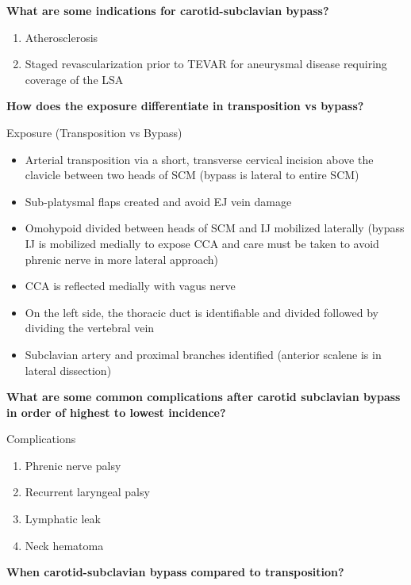 \documentclass[
]{book}
\begin{document}
\textbf{What are some indications for carotid-subclavian bypass?}

\begin{enumerate}
\def\labelenumi{\arabic{enumi}.}
\item
  Atherosclerosis~
\item
  Staged revascularization prior to TEVAR for aneurysmal disease
  requiring coverage of the LSA
\end{enumerate}

\textbf{How does the exposure differentiate in transposition vs bypass?}

Exposure (Transposition vs Bypass)

\begin{itemize}
\item
  Arterial transposition via a short, transverse cervical incision
  above the clavicle between two heads of SCM (bypass is lateral to
  entire SCM)
\item
  Sub-platysmal flaps created and avoid EJ vein damage
\item
  Omohypoid divided between heads of SCM and IJ mobilized laterally
  (bypass IJ is mobilized medially to expose CCA and care must be
  taken to avoid phrenic nerve in more lateral approach)
\item
  CCA is reflected medially with vagus nerve~
\item
  On the left side, the thoracic duct is identifiable and divided
  followed by dividing the vertebral vein
\item
  Subclavian artery and proximal branches identified (anterior scalene
  is in lateral dissection)
\end{itemize}

\textbf{What are some common complications after carotid subclavian bypass in
order of highest to lowest incidence?}

Complications \citet{voigtOutcomesCarotidsubclavianBypass2019}

\begin{enumerate}
\def\labelenumi{\arabic{enumi}.}
\item
  Phrenic nerve palsy~~
\item
  Recurrent laryngeal palsy~~
\item
  Lymphatic leak~~
\item
  Neck hematoma~~
\end{enumerate}

\textbf{When carotid-subclavian bypass compared to transposition?}~~
\end{document}
